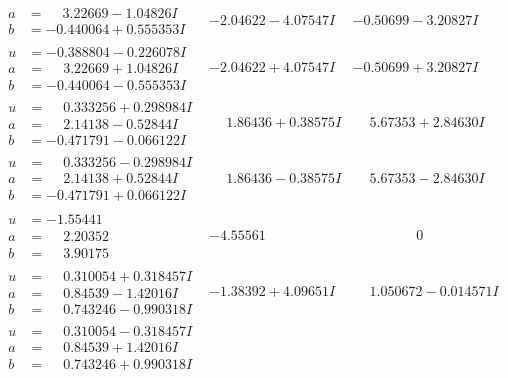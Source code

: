 \documentclass[1p]{elsarticle_modified}
\theoremstyle{definition}
\begin{document}
$$\begin{array}{c|c|c}
\begin{aligned}
a &= \phantom{-}3.22669 - 1.04826 I \\
b &= -0.440064 + 0.555353 I\end{aligned}
 & -2.04622 - 4.07547 I & -0.50699 - 3.20827 I \\ \hline\begin{aligned}
u &= -0.388804 - 0.226078 I \\
a &= \phantom{-}3.22669 + 1.04826 I \\
b &= -0.440064 - 0.555353 I\end{aligned}
 & -2.04622 + 4.07547 I & -0.50699 + 3.20827 I \\ \hline\begin{aligned}
u &= \phantom{-}0.333256 + 0.298984 I \\
a &= \phantom{-}2.14138 - 0.52844 I \\
b &= -0.471791 - 0.066122 I\end{aligned}
 & \phantom{-}1.86436 + 0.38575 I & \phantom{-}5.67353 + 2.84630 I \\ \hline\begin{aligned}
u &= \phantom{-}0.333256 - 0.298984 I \\
a &= \phantom{-}2.14138 + 0.52844 I \\
b &= -0.471791 + 0.066122 I\end{aligned}
 & \phantom{-}1.86436 - 0.38575 I & \phantom{-}5.67353 - 2.84630 I \\ \hline\begin{aligned}
u &= -1.55441\phantom{ +0.000000I} \\
a &= \phantom{-}2.20352\phantom{ +0.000000I} \\
b &= \phantom{-}3.90175\phantom{ +0.000000I}\end{aligned}
 & -4.55561\phantom{ +0.000000I} & \phantom{-0.000000 } 0 \\ \hline\begin{aligned}
u &= \phantom{-}0.310054 + 0.318457 I \\
a &= \phantom{-}0.84539 - 1.42016 I \\
b &= \phantom{-}0.743246 - 0.990318 I\end{aligned}
 & -1.38392 + 4.09651 I & \phantom{-}1.050672 - 0.014571 I \\ \hline\begin{aligned}
u &= \phantom{-}0.310054 - 0.318457 I \\
a &= \phantom{-}0.84539 + 1.42016 I \\
b &= \phantom{-}0.743246 + 0.990318 I\end{aligned}

\end{array}$$
\end{document}
